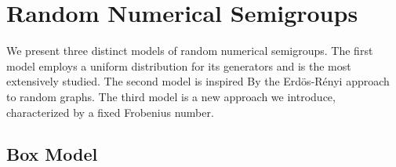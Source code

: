 
\chapter{Random Numerical Semigroups}\label{chap:randnumsems}

We present three distinct models of random numerical semigroups. The first model employs a uniform distribution for its generators and is the most extensively studied. The second model is inspired By the Erdös-Rényi approach to random graphs. The third model is a new approach we introduce, characterized by a fixed Frobenius number.

\section{Box Model}\label{sec:randomsmpgs:intro}

